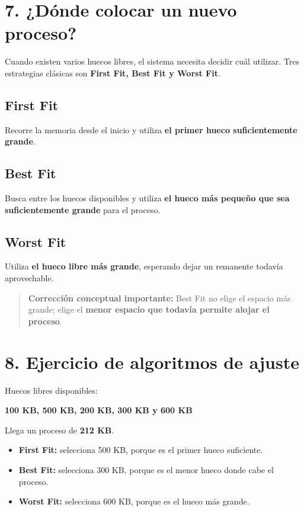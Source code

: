 \documentclass[
  spanish,
  letterpaper,
]{scrbook}
\providecommand{\tightlist}{%
  \setlength{\itemsep}{0pt}\setlength{\parskip}{0pt}}
\begin{document}
\section{7. ¿Dónde colocar un nuevo
proceso?}\label{duxf3nde-colocar-un-nuevo-proceso}

Cuando existen varios huecos libres, el sistema necesita decidir cuál
utilizar. Tres estrategias clásicas son \textbf{First Fit, Best Fit y
Worst Fit}.

\subsection{First Fit}\label{first-fit-5}

Recorre la memoria desde el inicio y utiliza \textbf{el primer hueco
suficientemente grande}.

\subsection{Best Fit}\label{best-fit-5}

Busca entre los huecos disponibles y utiliza \textbf{el hueco más
pequeño que sea suficientemente grande} para el proceso.

\subsection{Worst Fit}\label{worst-fit-3}

Utiliza \textbf{el hueco libre más grande}, esperando dejar un remanente
todavía aprovechable.

\begin{quote}
\textbf{Corrección conceptual importante:} Best Fit no elige el espacio
más grande; elige el \textbf{menor espacio que todavía permite alojar el
proceso}.
\end{quote}

\section{8. Ejercicio de algoritmos de
ajuste}\label{ejercicio-de-algoritmos-de-ajuste}

Huecos libres disponibles:

\textbf{100 KB, 500 KB, 200 KB, 300 KB y 600 KB}

Llega un proceso de \textbf{212 KB}.

\begin{itemize}
\tightlist
\item
  \textbf{First Fit:} selecciona 500 KB, porque es el primer hueco
  suficiente.
\item
  \textbf{Best Fit:} selecciona 300 KB, porque es el menor hueco donde
  cabe el proceso.
\item
  \textbf{Worst Fit:} selecciona 600 KB, porque es el hueco más grande.
\end{itemize}
\end{document}

